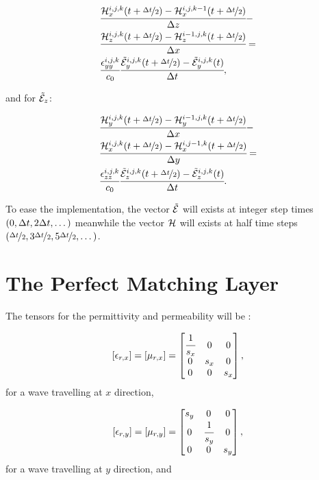 \begin{eqnarray}
    &\cfrac{\mathcal{H}_x^{i, j, k}(t+\nicefrac{\Delta t}{2})-\mathcal{H}_x^{i, j, k-1}(t+\nicefrac{\Delta t}{2})}{\Delta z} - \nonumber \\
    &\cfrac{\mathcal{H}_z^{i, j, k}(t+\nicefrac{\Delta t}{2})-\mathcal{H}_z^{i-1, j, k}(t+\nicefrac{\Delta t}{2})}{\Delta x} = \nonumber\\
    &\cfrac{\epsilon_{yy}^{i,j,k}}{c_0}\cfrac{\tilde{\mathcal{E}}_y^{i,j,k}(t+\nicefrac{\Delta t}{2})-\tilde{\mathcal{E}}_y^{i,j,k}(t)}{\Delta t},
    \label{eq:fd_ey}
\end{eqnarray}

and for $\tilde{\mathcal{E}}_z$:

\begin{eqnarray}
    &\cfrac{\mathcal{H}_y^{i, j, k}(t+\nicefrac{\Delta t}{2})-\mathcal{H}_y^{i-1, j, k}(t+\nicefrac{\Delta t}{2})}{\Delta x} - \nonumber \\ 
    & \cfrac{\mathcal{H}_x^{i, j, k}(t+\nicefrac{\Delta t}{2})-\mathcal{H}_x^{i, j-1, k}(t+\nicefrac{\Delta t}{2})}{\Delta y} = \nonumber\\
    &\cfrac{\epsilon_{zz}^{i,j,k}}{c_0}\cfrac{\tilde{\mathcal{E}}_z^{i,j,k}(t+\nicefrac{\Delta t}{2})-\tilde{\mathcal{E}}_z^{i,j,k}(t)}{\Delta t}.
    \label{eq:fd_ez}
\end{eqnarray}


To ease the implementation, the vector $\tilde{\mathcal{E}}$ will exists at integer step times $(0, \Delta t, 2\Delta t, \dots)$ meanwhile the vector $\mathcal{H}$ will exists at half time steps $(\nicefrac{\Delta t}{2}, 3\nicefrac{\Delta t}{2}, 5\nicefrac{\Delta t}{2}, \dots)$.

\section{The Perfect Matching Layer}

The tensors for the permittivity and permeability will be \cite{rumpf_book}:

\begin{equation}
    \brackets{\epsilon_{r,x}} = \brackets{\mu_{r,x}} = \begin{bmatrix}
        \cfrac{1}{s_x} & 0 & 0 \\
        0 & s_x & 0 \\
        0 & 0 & s_x
    \end{bmatrix},
\end{equation}
for a wave travelling at $x$ direction,

\begin{equation}
    \brackets{\epsilon_{r,y}} = \brackets{\mu_{r,y}} = \begin{bmatrix}
        s_y & 0 & 0 \\
        0 & \cfrac{1}{s_y} & 0 \\
        0 & 0 & s_y
    \end{bmatrix},
\end{equation}
for a wave travelling at $y$ direction, and

